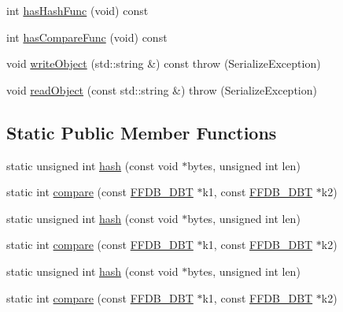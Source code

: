 \begin{DoxyCompactItemize}
\item 
int \mbox{\hyperlink{classFILEDB_1_1StringKey_afb2fa99d53c0f4b5aeca0377228ea722}{has\+Hash\+Func}} (void) const
\item 
int \mbox{\hyperlink{classFILEDB_1_1StringKey_a430c4d6d22db7160c501c1703f9f13cf}{has\+Compare\+Func}} (void) const
\item 
void \mbox{\hyperlink{classFILEDB_1_1StringKey_a29db7eea425c851c5e0a4336d7a85fb1}{write\+Object}} (std\+::string \&) const  throw (\+Serialize\+Exception)
\item 
void \mbox{\hyperlink{classFILEDB_1_1StringKey_a25cefb184c88bc5bf871245e82ea21f9}{read\+Object}} (const std\+::string \&)  throw (\+Serialize\+Exception)
\end{DoxyCompactItemize}
\subsection*{Static Public Member Functions}
\begin{DoxyCompactItemize}
\item 
static unsigned int \mbox{\hyperlink{classFILEDB_1_1StringKey_a505786f9d6a7eec5531eac0f0026d8c3}{hash}} (const void $\ast$bytes, unsigned int len)
\item 
static int \mbox{\hyperlink{classFILEDB_1_1StringKey_a22a3b33f93050dffa239cfc106044935}{compare}} (const \mbox{\hyperlink{adat-devel_2other__libs_2filedb_2filehash_2ffdb__db_8h_aa2e0984399491df0fdd20898ca8758f9}{F\+F\+D\+B\+\_\+\+D\+BT}} $\ast$k1, const \mbox{\hyperlink{adat-devel_2other__libs_2filedb_2filehash_2ffdb__db_8h_aa2e0984399491df0fdd20898ca8758f9}{F\+F\+D\+B\+\_\+\+D\+BT}} $\ast$k2)
\item 
static unsigned int \mbox{\hyperlink{classFILEDB_1_1StringKey_a505786f9d6a7eec5531eac0f0026d8c3}{hash}} (const void $\ast$bytes, unsigned int len)
\item 
static int \mbox{\hyperlink{classFILEDB_1_1StringKey_a22a3b33f93050dffa239cfc106044935}{compare}} (const \mbox{\hyperlink{adat-devel_2other__libs_2filedb_2filehash_2ffdb__db_8h_aa2e0984399491df0fdd20898ca8758f9}{F\+F\+D\+B\+\_\+\+D\+BT}} $\ast$k1, const \mbox{\hyperlink{adat-devel_2other__libs_2filedb_2filehash_2ffdb__db_8h_aa2e0984399491df0fdd20898ca8758f9}{F\+F\+D\+B\+\_\+\+D\+BT}} $\ast$k2)
\item 
static unsigned int \mbox{\hyperlink{classFILEDB_1_1StringKey_a505786f9d6a7eec5531eac0f0026d8c3}{hash}} (const void $\ast$bytes, unsigned int len)
\item 
static int \mbox{\hyperlink{classFILEDB_1_1StringKey_a22a3b33f93050dffa239cfc106044935}{compare}} (const \mbox{\hyperlink{adat-devel_2other__libs_2filedb_2filehash_2ffdb__db_8h_aa2e0984399491df0fdd20898ca8758f9}{F\+F\+D\+B\+\_\+\+D\+BT}} $\ast$k1, const \mbox{\hyperlink{adat-devel_2other__libs_2filedb_2filehash_2ffdb__db_8h_aa2e0984399491df0fdd20898ca8758f9}{F\+F\+D\+B\+\_\+\+D\+BT}} $\ast$k2)
\end{DoxyCompactItemize}
